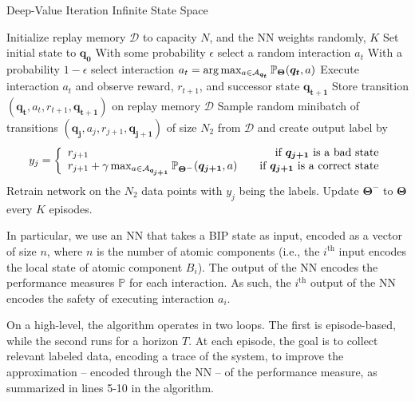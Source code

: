 \begin{algorithm}[h!]
\caption{Deep-Value Iteration Infinite State Space}
\label{Algo:VI2}
\begin{algorithmic}[1]
\STATE Initialize replay memory $\mathcal{D}$ to capacity $N$, and the NN weights randomly, $K$
\STATE Set initial state to $ \bm{q_{0}}$
\STATE With some probability $\epsilon$ select a random interaction $a_{t}$
\STATE With a probability $1 - \epsilon$ select interaction $a_{t} = \arg\max_{a\in {\cal A}_{\bm{q_t}}}\mathbb{P}_{\bm{\Theta}}( \bm{q_t},a)$
\STATE Execute interaction $a_{t}$ and observe reward, $r_{t+1}$, and successor state $ \bm{q_{t+1}}$
\STATE Store transition $\left( \bm{q_{t}}, a_{t}, r_{t+1},  \bm{q_{t+1}}\right)$ on replay memory $\mathcal{D}$
\STATE Sample random minibatch of transitions $\left( \bm{q_{j}}, a_{j}, r_{j+1},  \bm{q_{j+1}}\right)$ of size $N_{2}$ from $\mathcal{D}$ and create output label by 
\begin{displaymath}
   y_{j} = \left\{
     \begin{array}{lr}
       r_{j+1} & \text{if $\bm{q_{j+1}}$ is a bad state}\\
        r_{j+1} + \gamma \max_{a \in {\cal A}_{\bm{q_{j+1}}}} \mathbb{P}_{\bm{\Theta^{-}}}(\bm{q_{j+1}},a)  & \text{\quad if $\bm{q_{j+1}}$ is a correct state}
     \end{array}
   \right.
\end{displaymath} 
\ENDFOR
\STATE Retrain network on the $N_{2}$ data points with $y_{j}$ being the labels. 
\STATE Update ${\bm{\Theta^{-}}}$ to ${\bm{\Theta}}$ every $K$ episodes.
\ENDFOR
\end{algorithmic}
\end{algorithm}

In particular, we use an NN that takes a BIP state as input, encoded as a vector of size $n$, where $n$ is the number of atomic components (i.e., the $i^{\text{th}}$ input encodes the local state of atomic component $B_i$). The output of the NN encodes the performance measures $\mathbb{P}$ for each interaction. As such, the $i^{\text{th}}$ output of the NN encodes the safety of executing interaction $a_i$.  

On a high-level, the algorithm operates in two loops. The first is episode-based, while the second runs for a horizon $T$. At each episode, the goal is to collect relevant labeled data, encoding a trace of the system, to improve the approximation -- encoded through the NN -- of the performance measure, as summarized in lines 5-10 in the algorithm. 

